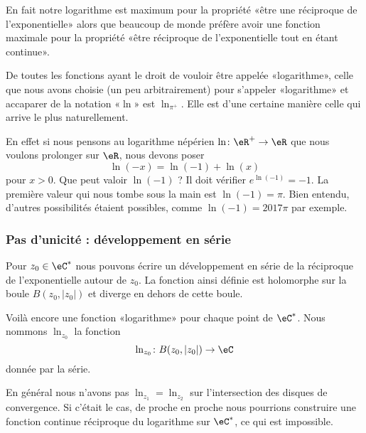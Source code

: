 \begin{remark}
    En fait notre logarithme est maximum pour la propriété «être une réciproque de l'exponentielle» alors que beaucoup de monde préfère avoir une fonction maximale pour la propriété «être réciproque de l'exponentielle tout en étant continue».

\end{remark}

De toutes les fonctions ayant le droit de vouloir être appelée «logarithme», celle que nous avons choisie (un peu arbitrairement) pour s'appeler «logarithme» et accaparer de la notation «\( \ln\)» est \( \ln_{\pi^+}\). Elle est d'une certaine manière celle qui arrive le plus naturellement.

En effet si nous pensons au logarithme népérien \( \ln\colon \eR^+\to \eR\) que nous voulons prolonger sur \( \eR\), nous devons poser
\begin{equation}
    \ln(-x)=\ln(-1)+\ln(x)
\end{equation}
pour \( x>0\). Que peut valoir \( \ln(-1)\) ? Il doit vérifier \(  e^{\ln(-1)}=-1\). La première valeur qui nous tombe sous la main est \( \ln(-1)=\pi\). Bien entendu, d'autres possibilités étaient possibles, comme \( \ln(-1)=2017\pi\) par exemple.

\subsubsection{Pas d'unicité : développement en série}

Pour \( z_0\in \eC^*\) nous pouvons écrire un développement en série de la réciproque de l'exponentielle autour de \( z_0\). La fonction ainsi définie est holomorphe sur la boule \( B(z_0,| z_0 |)\) et diverge en dehors de cette boule.

Voilà encore une fonction «logarithme» pour chaque point de \( \eC^*\). Nous nommons \( \ln_{z_0}\) la fonction
\begin{equation}
    \ln_{z_0}\colon B(z_0,| z_0 |)\to \eC
\end{equation}
donnée par la série.

En général nous n'avons pas \( \ln_{z_1}=\ln_{z_2}\) sur l'intersection des disques de convergence. Si c'était le cas, de proche en proche nous pourrions construire une fonction continue réciproque du logarithme sur \( \eC^*\), ce qui est impossible.

